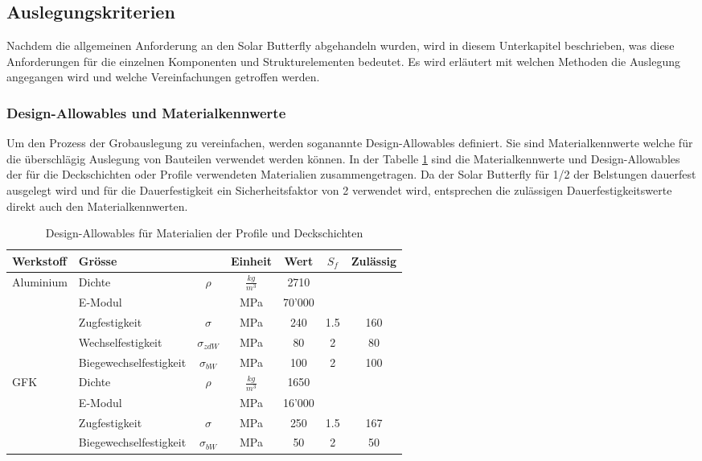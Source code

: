 \subsection{Auslegungskriterien}
Nachdem die allgemeinen Anforderung an den Solar Butterfly abgehandeln wurden, wird in diesem Unterkapitel beschrieben, was diese Anforderungen für die einzelnen Komponenten und Strukturelementen bedeutet. Es wird erläutert mit welchen Methoden die Auslegung angegangen wird und welche Vereinfachungen getroffen werden.\\

  \subsubsection{Design-Allowables und Materialkennwerte}
  Um den Prozess der Grobauslegung zu vereinfachen, werden soganannte Design-Allowables definiert. Sie sind Materialkennwerte welche für die überschlägig Auslegung von Bauteilen verwendet werden können.
  In der Tabelle \ref{tab:Design-Allowables} sind die Materialkennwerte und Design-Allowables der für die Deckschichten oder Profile verwendeten Materialien zusammengetragen. Da der Solar Butterfly für 1/2 der Belstungen dauerfest ausgelegt wird und für die Dauerfestigkeit ein Sicherheitsfaktor von 2 verwendet wird, entsprechen die zulässigen Dauerfestigkeitswerte direkt auch den Materialkennwerten.\\

  \begin{table}[H]
    \centering
    \caption{Design-Allowables für Materialien der Profile und Deckschichten}
    \begin{tabular}{llccccc}	\hline
      Werkstoff	&	Grösse	&		&	Einheit	&	Wert	&	$S_f$	&	Zulässig\\	\hline
      \multirow{5}{*}{Aluminium\cite{alu1}}	&	Dichte	&	$\rho$        	&	$\frac{kg}{m^3}$	&	2710	&		&		\\
      	&	E-Modul	&	              	&	MPa	&	70'000	&		&		\\
      	&	Zugfestigkeit	&	$\sigma$      	&	MPa	&	240	&	1.5	&	160	\\
      	&	Wechselfestigkeit	&	$\sigma_{zdW}$	&	MPa	&	80	&	2	&	80	\\
      	&	Biegewechselfestigkeit	&	$\sigma_{bW}$ 	&	MPa	&	100	&	2	&	100	\\	\hline
      \multirow{4}{*}{GFK\cite{Roloff}}	&	Dichte	&	$\rho$        	&	$\frac{kg}{m^3}$	&	1650	&		&		\\
      	&	E-Modul	&	              	&	MPa	&	16'000	&		&		\\
      	&	Zugfestigkeit	&	$\sigma$      	&	MPa	&	250	&	1.5	&	167	\\
      	&	Biegewechselfestigkeit	&	$\sigma_{bW}$ 	&	MPa	&	50	&	2	&	50	\\	\hline
    \end{tabular}
    \label{tab:Design-Allowables}
  \end{table}


